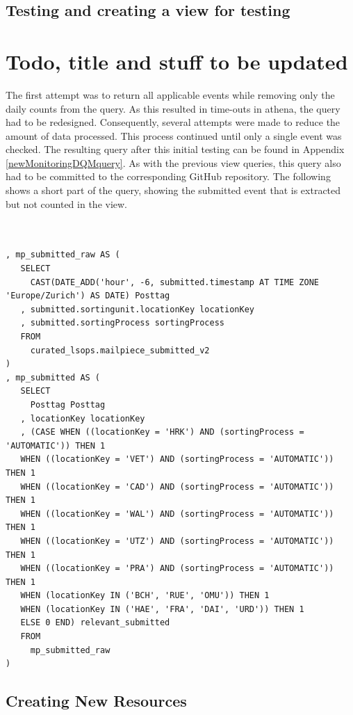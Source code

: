 \subsection*{Testing and creating a view for testing}
\section{Todo, title and stuff to be updated}

The first attempt was to return all applicable events while removing only the daily counts from the query. As this resulted in time-outs in \gls{athena}, the query had to be redesigned. Consequently, several attempts were made to reduce the amount of data processed. This process continued until only a single event was checked. The resulting query after this initial testing can be found in Appendix \ref{newMonitoringDQMquery}. As with the previous view queries, this query also had to be committed to the corresponding GitHub repository. The following shows a short part of the query, showing the submitted event that is extracted but not counted in the view.

\begin{lstlisting}[style=sqlstyle]


, mp_submitted_raw AS (
   SELECT
     CAST(DATE_ADD('hour', -6, submitted.timestamp AT TIME ZONE 'Europe/Zurich') AS DATE) Posttag
   , submitted.sortingunit.locationKey locationKey
   , submitted.sortingProcess sortingProcess
   FROM
     curated_lsops.mailpiece_submitted_v2
) 
, mp_submitted AS (
   SELECT
     Posttag Posttag
   , locationKey locationKey
   , (CASE WHEN ((locationKey = 'HRK') AND (sortingProcess = 'AUTOMATIC')) THEN 1 
   WHEN ((locationKey = 'VET') AND (sortingProcess = 'AUTOMATIC')) THEN 1 
   WHEN ((locationKey = 'CAD') AND (sortingProcess = 'AUTOMATIC')) THEN 1 
   WHEN ((locationKey = 'WAL') AND (sortingProcess = 'AUTOMATIC')) THEN 1 
   WHEN ((locationKey = 'UTZ') AND (sortingProcess = 'AUTOMATIC')) THEN 1 
   WHEN ((locationKey = 'PRA') AND (sortingProcess = 'AUTOMATIC')) THEN 1 
   WHEN (locationKey IN ('BCH', 'RUE', 'OMU')) THEN 1 
   WHEN (locationKey IN ('HAE', 'FRA', 'DAI', 'URD')) THEN 1 
   ELSE 0 END) relevant_submitted
   FROM
     mp_submitted_raw
) 

\end{lstlisting}





\subsection*{Creating New Resources}

